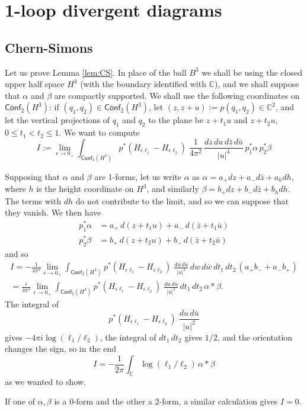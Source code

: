 \documentclass[a4paper]{amsart}
\theoremstyle{plain}
\theoremstyle{definition}
\newcommand{\C}{\mathbb{C}}
\newcommand{\cf}{\mathsf{Conf}}
\begin{document}
\appendix

\section{1-loop divergent diagrams}
\subsection{Chern-Simons}
Let us prove Lemma \ref{lem:CS}. In place of the ball $B^3$ we shall be using the closed upper half space $H^3$ (with the boundary identified with $\C$), and we shall suppose that $\alpha$ and $\beta$ are compactly supported. We shall use the following coordinates on $\cf_2(H^3)$: if $(q_1,q_2)\in\cf_2(H^3)$, let $(z,z+u):=p(q_1,q_2)\in\C^2$, and let the vertical projections of $q_1$ and $q_2$ to the plane be $z+t_1u$ and $z+t_2u$, $0\leq t_1<t_2\leq1$. We want to compute
$$I:=
\lim_{\epsilon\to0_+}\int_{\cf_2(H^3)}p^*(H_{\epsilon\ell_1}-H_{\epsilon\ell_2})\;\frac1{4\pi^2}\,\frac{dz\,du\,d\bar z\,d\bar u}{|u|^4}\,p_1^*\alpha\, p_2^*\beta
$$

Supposing that $\alpha$ and $\beta$ are 1-forms, let us write $\alpha$ as $\alpha=a_+dz + a_-d\bar z + a_h dh$, where $h$ is the height coordinate on $H^3$, and similarly 
$\beta=b_+dz + b_-d\bar z + b_h dh$. The terms with $dh$ do not contribute to the limit, and so we can suppose that they vanish. We then have
\begin{align*}
p_1^*\alpha&=a_+\, d(z+t_1 u) + a_-\, d(\bar z + t_1\bar u)\\
p_2^*\beta&=b_+\, d(z+t_2 u) + b_-\, d(\bar z + t_2\bar u)
\end{align*}
and so
\begin{multline*}
I=-\frac1{4\pi^2}\lim_{\epsilon\to0_+}\int_{\cf_2(H^3)}p^*(H_{\epsilon\ell_1}-H_{\epsilon\ell_2})\;\frac{du\,d\bar u}{|u|^2}\,dw\,d\bar w\,dt_1\,dt_2\,(a_+b_-+a_-b_+) \\
=\frac i{4\pi^2}\lim_{\epsilon\to0_+}\int_{\cf_2(H^3)}p^*(H_{\epsilon\ell_1}-H_{\epsilon\ell_2})\;\frac{du\,d\bar u}{|u|^2}\,dt_1\,dt_2\,\alpha *\beta.
\end{multline*}
The integral of 
$$p^*(H_{\epsilon\ell_1}-H_{\epsilon\ell_2})\;\frac{du\,d\bar u}{|u|^2}$$
gives $-4\pi i\log(\ell_1/\ell_2)$, the integral of $dt_1\,dt_2$ gives $1/2$, and the orientation changes the sign, so in the end
$$I=-\frac1{2\pi}\int_\C\log(\ell_1/\ell_2)\,\alpha*\beta$$
as we wanted to show.

If one of $\alpha,\beta$ is a 0-form and the other a 2-form, a similar calculation gives $I=0$.
\end{document}
